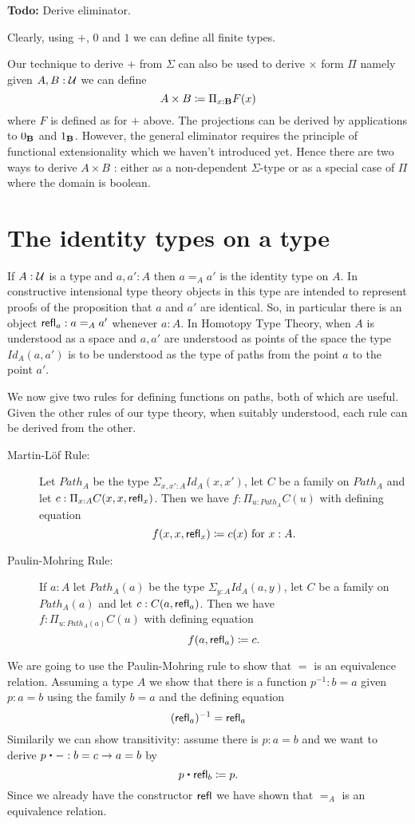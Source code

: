 {\textbf{Todo:} Derive eliminator.

Clearly, using $+$, $0$ and $1$ we can define all finite types.

Our technique to derive $+$ from $\Sigma$ can also be used to derive
$\times$ form $\Pi$ namely given $A,B:{\mathcal U}$ we can define 
\[ A \times B \coloneqq \Pi_{x:{\bf B}}F(x)\]
where $F$ is defined as for $+$ above. The projections can be derived
by applications to $0_{\bf B}$ and $1_{\bf B}$. However, the general
eliminator requires the principle of functional extensionality which
we haven't introduced yet. Hence there are two ways to derive $A\times
B$ : either as a non-dependent $\Sigma$-type or as a special case of
$\Pi$ where the domain is boolean. 

\section{The identity types on a type}
If $A:{\mathcal U}$ is a type and $a,a':A$ then $a =_A a'$ is the identity type on $A$.  
In constructive intensional type theory objects in this type are
intended to represent proofs of the proposition that $a$ and $a'$ are
identical.  So, in particular there is an object $\mathsf{refl}_{a}: a =_A a'$ whenever $a:A$.  In Homotopy Type Theory, when $A$ is understood as a space and $a,a'$ are understood as points of the space the type $Id_A(a,a')$ is to be understood as the type of paths from the point $a$ to the point $a'$.

We now give two rules for defining functions on paths, both of which are useful.  Given the other rules of our type theory, when suitably understood, each rule can be derived from the other. 

\begin{description}
\item[Martin-L\"{o}f Rule:] Let $Path_A$ be the type $\Sigma_{x,x':A}Id_A(x,x')$, let $C$ be a family on $Path_A$ and let $c:\Pi_{x:A}C(x,x,\mathsf{refl}_{x})$.  Then we have $f:\Pi_{u:Path_A}C(u)$ with defining equation
  \[ f(x,x,\mathsf{refl}_{x})\coloneqq c(x)\mbox{ for } x:A.\]
\item[Paulin-Mohring Rule:] If $a:A$ let $Path_A(a)$ be the type $\Sigma_{y:A}Id_A(a,y)$, let $C$ be a family on $Path_A(a)$ and let $c:C(a,\mathsf{refl}_{a})$. Then we have\\ $f:\Pi_{u:Path_A(a)}C(u)$ with defining equation
    \[ f(a,\mathsf{refl}_{a})\coloneqq c.\]
\end{description}

We are going to use the Paulin-Mohring rule to show that $=$ is an
equivalence relation. Assuming a type $A$ we show that there is a function
$p^{-1} : b = a$ given $p : a = b$ using the family $b = a$ and
the defining equation
\[ (\mathsf{refl}_{a})^{-1} = \mathsf{refl}_{a} \]
Similarily we can show transitivity: assume there is $p : a = b$ and
we want to derive $p \ct - : b = c \to a = b$ by
\[ p \ct \refl{b} \defeq p.\]
Since we already have the constructor $\mathsf{refl}_{}$ we have shown that $=_A$
is an equivalence relation. 


}
